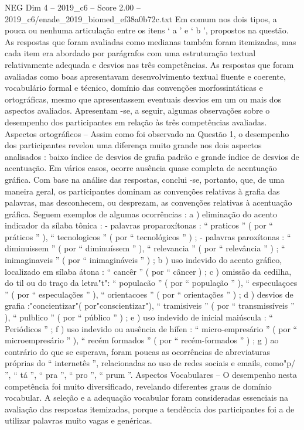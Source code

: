 \begin{textsample}{NEG Dim 4 – 2019\_c6 – Score 2.00 – 2019\_c6/enade\_2019\_biomed\_ef38a0b72c.txt}
Em comum nos dois tipos, a pouca ou nenhuma articulação entre os itens ‘ a ’ e ‘ b ’, propostos na questão.
As respostas que foram avaliadas como medianas também foram itemizadas, mas cada item era abordado por parágrafos com uma estruturação textual relativamente adequada e desvios nas três competências.
As respostas que foram avaliadas como boas apresentavam desenvolvimento textual fluente e coerente, vocabulário formal e técnico, domínio das convenções morfossintáticas e ortográficas, mesmo que apresentassem eventuais desvios em um ou mais dos aspectos avaliados.
Apresentam -se, a seguir, algumas observações sobre o desempenho dos participantes em relação às três competências avaliadas.
Aspectos ortográficos – Assim como foi observado na Questão 1, o desempenho dos participantes revelou uma diferença muito grande nos dois aspectos analisados : baixo índice de desvios de grafia padrão e grande índice de desvios de acentuação.
Em vários casos, ocorre ausência quase completa de acentuação gráfica.
Com base na análise das respostas, conclui -se, portanto, que, de uma maneira geral, os participantes dominam as convenções relativas à grafia das palavras, mas desconhecem, ou desprezam, as convenções relativas à acentuação gráfica.
Seguem exemplos de algumas ocorrências : a ) eliminação do acento indicador da sílaba tônica : - palavras proparoxítonas : “ praticos ” ( por “ práticos ” ), “ tecnologicos ” ( por “ tecnológicos ” ) ; - palavras paroxítonas : “ diminuissem ” ( por “ diminuíssem ” ), “ relevancia ” ( por “ relevância ” ) ; “ inimaginaveis ” ( por “ inimagináveis ” ) ; b ) uso indevido do acento gráfico, localizado em sílaba átona : “ cancêr ” ( por “ câncer ) ; c ) omissão da cedilha, do til ou do traço da letra"t": “ populacão ” ( por “ população ” ), “ especulaçoes ” ( por “ especulações ” ), “ orientacoes ” ( por “ orientações ” ) ; d ) desvios de grafia :"concientizar"( por"conscientizar"), “ tramisiveis ” ( por “ transmissíveis ” ), “ pulblico ” ( por “ público ” ) ; e ) uso indevido de inicial maiúscula : “ Periódicos ” ; f ) uso indevido ou ausência de hífen : “ micro-empresário ” ( por “ microempresário ” ), “ recém formados ” ( por “ recém-formados ” ) ; g ) ao contrário do que se esperava, foram poucas as ocorrências de abreviaturas próprias do “ internetês ”, relacionadas ao uso de redes sociais e emails, como"p/ ”, “ tá ”, “ pra ”, “ pro ”, “ prum ”.
Aspectos Vocabulares – O desempenho nesta competência foi muito diversificado, revelando diferentes graus de domínio vocabular.
A seleção e a adequação vocabular foram consideradas essenciais na avaliação das respostas itemizadas, porque a tendência dos participantes foi a de utilizar palavras muito vagas e genéricas.

\end{textsample}
